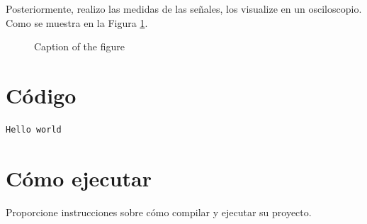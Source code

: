 \documentclass{article}
\begin{document}
Posteriormente, realizo las medidas de las señales, los visualize en un osciloscopio. Como se muestra en la Figura \ref{fig:osciloscopio}.
\begin{figure}[H]
    \centering
    \caption{Caption of the figure}
    \label{fig:osciloscopio}
\end{figure}

\section{Código}
\begin{lstlisting}[language=C]
    Hello world
\end{lstlisting}

\section{Cómo ejecutar}
Proporcione instrucciones sobre cómo compilar y ejecutar su proyecto.
\end{document}
